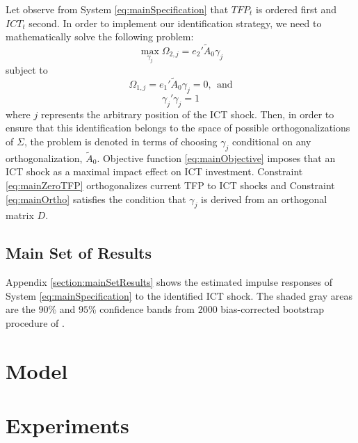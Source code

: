 \documentclass[12pt]{article}
\begin{document}
Let observe from System \ref{eq:mainSpecification} that $TFP_t$ is ordered first and $ICT_t$ second. In order to implement our identification strategy, we need to mathematically solve the following problem:
\begin{equation}\label{eq:mainObjective}
\max_{\gamma_j} \Omega_{2,j} = e_2' \tilde{A}_0 \gamma_j
\end{equation}
subject to
\begin{equation}\label{eq:mainZeroTFP}
\Omega_{1,j} = e_1' \tilde{A}_0 \gamma_j = 0, \ \ \text{and}
\end{equation}
\begin{equation}\label{eq:mainOrtho}
\gamma_j' \gamma_j = 1
\end{equation}
where $j$ represents the arbitrary position of the ICT shock. Then, in order to ensure that this identification belongs to the space of possible orthogonalizations of $\Sigma$, the problem is denoted in terms of choosing $\gamma_j$ conditional on any orthogonalization, $\tilde{A}_0$. Objective function \ref{eq:mainObjective} imposes that an ICT shock as a maximal impact effect on ICT investment. Constraint \ref{eq:mainZeroTFP} orthogonalizes current TFP to ICT shocks and Constraint \ref{eq:mainOrtho} satisfies the condition that $\gamma_j$ is derived from an orthogonal matrix $D$.  

\subsection{Main Set of Results}

Appendix \ref{section:mainSetResults} shows the estimated impulse responses of System \ref{eq:mainSpecification} to the identified ICT shock. The shaded gray areas are the $90$\% and $95$\% confidence bands from 2000 bias-corrected bootstrap procedure of \cite{kilian1998small}. 

\section{Model}\label{section:theory}


\section{Experiments}\label{section:experiments}
\end{document}
